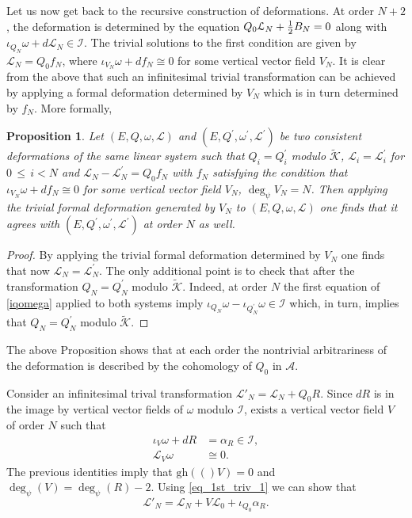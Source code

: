 \documentclass[a4paper,12pt]{article}
\numberwithin{equation}{section} %
\newtheorem{prop}[thm]{Proposition}
\renewcommand{\simeq}{\cong}
\newcommand{\gh}[1]{\mathrm{gh}(#1)}
\renewcommand{\leq}{\,{\leqslant}\,}
\newcommand{\half}{\mathchoice{%
    \ffrac{1}{2}}{\frac{1}{2}}{\frac{1}{2}}{\frac{1}{2}}}
\newcommand{\ffrac}[2]{\raisebox{.5pt}%
  {\footnotesize$\displaystyle\frac{#1}{#2}$}\kern1pt}
\newcommand{\algA}{\mathcal{A}}
\def\cI{\mathcal{I}}
\def\cK{\mathcal{K}}
\def\cL{\mathcal{L}}
\newcommand{\wker}{{\widetilde{\cK}}}
\newcommand{\h}{\cL}
\begin{document}
Let us now get back to the recursive construction of deformations. At order $N+2$, the deformation is determined by the equation $Q_0 \cL_N +\half B_N=0$ along with $\iota_{Q_N}\omega+d\cL_N\in \cI$. The trivial solutions to the first condition are given by $\cL_N=Q_0 f_N$, where $\iota_{V_N}\omega+df_N\simeq 0$ for some vertical vector field $V_N$. It is clear from the above that such an infinitesimal trivial transformation can be achieved by applying a formal deformation determined by $V_N$ which is in turn determined by $f_N$.
More formally, 
\begin{prop}
Let $(E,Q,\omega,\cL)$ and $(E,Q^\prime,\omega^\prime,\cL^\prime)$ be two consistent deformations of the same linear system such that $Q_i=Q^\prime_i$ modulo $\wker$, $\cL_i=\cL^\prime_i$ for $0\leq i<N$ and $\cL_N-\cL^\prime_N=Q_0f_N$ with $f_N$ satisfying the condition that $\iota_{V_N}\omega+df_N\simeq 0$ for some vertical vector field $V_N$, $\deg_\psi V_N=N$. Then applying the trivial formal deformation generated by $V_N$ to $(E,Q,\omega,\cL)$ one finds that it agrees with $(E,Q^\prime,\omega^\prime,\cL^\prime)$ at order $N$ as well. 
\end{prop}
\begin{proof}
By applying the trivial formal deformation determined by $V_N$ one finds that now $\cL_N=\cL^\prime_N$. The only additional point is to check that after the transformation $Q_N=Q^\prime_N$ modulo $\wker$. Indeed, at order $N$ the first equation of \eqref{iqomega} applied to both systems imply $\iota_{Q_N}\omega-\iota_{Q^\prime_N}\omega\in \cI$ which, in turn, implies that $Q_N=Q^\prime_N$ modulo $\wker$.
\end{proof}
The above Proposition shows that at each order the nontrivial arbitrariness of the deformation is described by the cohomology of $Q_0$ in $\algA$.

\iffalse

Consider an infinitesimal trival transformation $\h'_N = \h_N + Q_0 R$. Since $dR$ is in the image by vertical vector fields of $\omega$ modulo $\mathcal{I}$, exists a vertical vector field $V$ of order $N$ such that
\begin{align}
	\iota_V\omega + dR &= \alpha_R \in \mathcal{I}, \label{eq_1st_triv_1} \\
	\mathcal{L}_V\omega &\simeq 0. \label{eq_1st_triv_2}
\end{align}
The previous identities imply that $\gh(V)=0$ and $\deg_\psi(V)=\deg_\psi(R)-2$. Using \eqref{eq_1st_triv_1} we can show that
\begin{equation}
	\h'_N = \h_N + V\h_0 + \iota_{Q_0}\alpha_R.
\end{equation}
\end{document}
